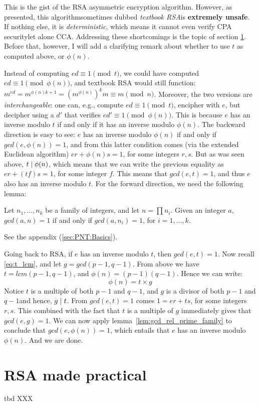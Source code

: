   This is the gist of the RSA asymmetric encryption  algorithm. However, as presented, this algorithm\emd sometimes dubbed \emph{textbook RSA}\emd is \textbf{extremely unsafe}. If nothing else, it is \emph{deterministic}, which means it cannot even verify CPA security\emd let alone CCA. Addressing these shortcomings is the topic of section \ts\ref{sec:practical_rsa}. Before that, however, I will add a clarifying remark about whether to use $t$ as computed above, or $\phi(n)$.

  Instead of computing $ed \equiv 1 \pmod{t}$, we could have computed $ed \equiv 1 \pmod{\phi(n)}$, and textbook RSA would still function: $m^{ed} = m^{\phi(n)k +1} = (m^{\phi(n)})^k m \equiv m\pmod{n}$. Moreover, the two versions are \emph{interchangeable}: one can, e.g., compute $ed \equiv 1 \pmod{t}$, encipher with $e$, but decipher using a $d'$ that verifies $ed' \equiv 1 \pmod{\phi(n)}$. This is because $e$ has an inverse modulo $t$ if and only if it has an inverse modulo $\phi(n)$. The backward direction is easy to see: $e$ has an inverse modulo $\phi(n)$ if and only if $gcd(e, \phi(n)) = 1$, and from this latter condition comes (via the extended Euclidean algorithm) $er + \phi(n)s = 1$, for some integers $r, s$. But as was seen above, $t\mathrel{|} \phi(n)$, which means that we can write the previous equality as $er + (tf)s = 1$, for some integer $f$. This means that $gcd(e, t) = 1$, and thus $e$ also has an inverse modulo $t$. For the forward direction, we need the following lemma:
  \begin{lemma}
    \label{lem:gcd_rel_prime_family}
    Let $n_1, \dots, n_k$ be a family of integers, and let $n = \prod n_i$. Given an integer $a$, $gcd(a, n) = 1$ if and only if $gcd(a, n_i) = 1$, for $i = 1, \dots, k$.
  \end{lemma}
   See the appendix (\ts\ref{sec:PNT:Basics}).

  \smallskip

  \noindent Going back to RSA, if $e$ has an inverse modulo $t$, then $gcd(e, t) = 1$. Now recall \eqref{eq:t_lcm}, and let $g = gcd(p-1, q-1)$. From above we have $t = lcm(p-1, q-1)$, and $\phi(n) = (p-1)(q-1)$. Hence we can write:
  \begin{equation}
    \phi(n) = t\times g
  \end{equation}
  Notice $t$ is a multiple of both $p-1$ and $q-1$, and $g$ is a divisor of both  $p-1$ and $q-1$\emd and hence, $g \mathrel{|} t$.  From $gcd(e, t) = 1$ comes $1 = er + ts$, for some integers $r, s$. This combined with the fact that $t$ is a multiple of $g$ immediately gives that $gcd(e, g) = 1$. We can now apply lemma~\ref{lem:gcd_rel_prime_family} to conclude that $gcd(e, \phi(n)) = 1$, which entails that $e$ has an inverse modulo $\phi(n)$. And we are done.

\section{RSA made practical}
  \label{sec:practical_rsa}
  tbd XXX


